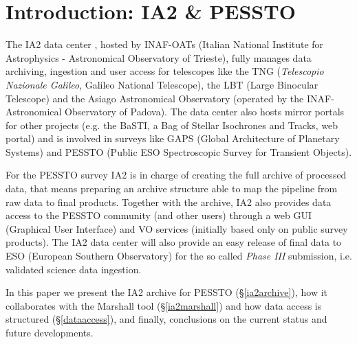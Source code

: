 \section{Introduction: IA2 \& PESSTO}

The IA2 data center \citep{molinaro_spie12}, hosted by INAF-OATs (Italian National Institute for Astrophysics - Astronomical Observatory of Trieste), fully manages data archiving, ingestion and user access for telescopes like the TNG (\textit{Telescopio Nazionale Galileo}, Galileo National Telescope), the LBT (Large Binocular Telescope) and the Asiago Astronomical Observatory (operated by the INAF-Astronomical Observatory of Padova). The data center also hosts mirror portals for other projects (e.g. the BaSTI, a Bag of Stellar Isochrones and Tracks, web portal) and is involved in surveys like GAPS (Global Architecture of Planetary Systems) and PESSTO (Public ESO Spectroscopic Survey for Transient Objects).

For the PESSTO survey IA2 is in charge of creating the full archive of processed data, that means preparing an archive structure able to map the pipeline from raw data to final products. Together with the archive, IA2 also provides data access to the PESSTO community (and other users) through a web GUI (Graphical User Interface) and VO services (initially based only on public survey products). The IA2 data center will also provide an easy release of final data to ESO (European Southern Observatory) for the so called \textit{Phase III} submission, i.e. validated science data ingestion.

In this paper we present the IA2 archive for PESSTO (\S \ref{ia2archive}), how it collaborates with the Marshall tool (\S \ref{ia2marshall}) and how data access is structured (\S \ref{dataaccess}), and finally, conclusions on the current status and future developments.


